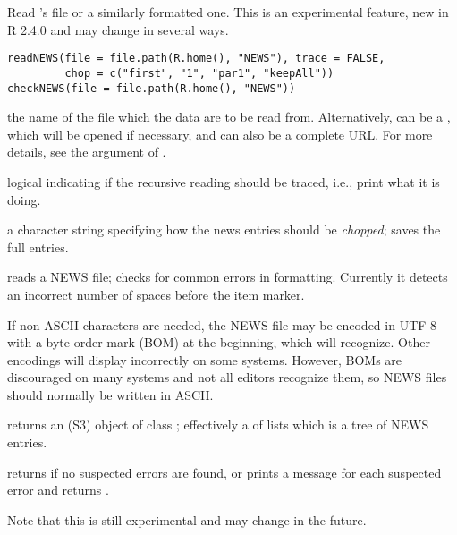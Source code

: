 %
\begin{Description}\relax
Read \R{}'s  file or a similarly formatted one.
This is an experimental feature, new in R 2.4.0
and may change in several ways.
\end{Description}
%
\begin{Usage}
\begin{verbatim}
readNEWS(file = file.path(R.home(), "NEWS"), trace = FALSE,
         chop = c("first", "1", "par1", "keepAll"))
checkNEWS(file = file.path(R.home(), "NEWS"))
\end{verbatim}
\end{Usage}
%
\begin{Arguments}
\begin{ldescription}
\item[\code{file}] the name of the file which the data are to be read from.
Alternatively,  can be a , which
will be opened if necessary, and can also be a complete URL.  For
more details, see the  argument of .
\item[\code{trace}] logical indicating if the recursive reading should be
traced, i.e., print what it is doing.
\item[\code{chop}] a character string specifying how the news entries should
be \emph{chopped};  saves the full entries.
\end{ldescription}
\end{Arguments}
%
\begin{Details}\relax
{} reads a NEWS file;  checks for common
errors in formatting.  Currently it detects an incorrect number of spaces before
the  item marker.

If non-ASCII characters are needed, the NEWS file may be encoded in
UTF-8 with a byte-order mark (BOM) at the beginning, which
 will recognize.  Other encodings will display
incorrectly on some systems.  However, BOMs are discouraged on many
systems and not all editors recognize them, so NEWS files should
normally be written in ASCII.
\end{Details}
%
\begin{Value}
 returns an (S3) object of class ; effectively
a  of lists which is a tree of NEWS entries.

 returns  if no suspected errors are found,
or prints a message for each suspected error and returns .

Note that this is still experimental and may change in the future.
\end{Value}
